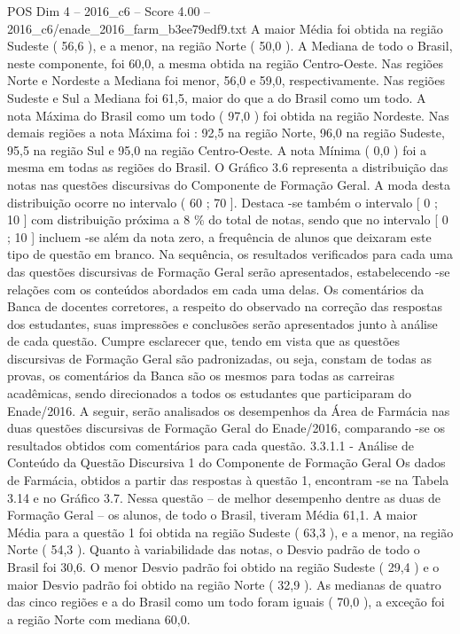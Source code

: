 \begin{textsample}{POS Dim 4 – 2016\_c6 – Score 4.00 – 2016\_c6/enade\_2016\_farm\_b3ee79edf9.txt}
A maior Média foi obtida na região Sudeste ( 56,6 ), e a menor, na região Norte ( 50,0 ).
A Mediana de todo o Brasil, neste componente, foi 60,0, a mesma obtida na região Centro-Oeste.
Nas regiões Norte e Nordeste a Mediana foi menor, 56,0 e 59,0, respectivamente.
Nas regiões Sudeste e Sul a Mediana foi 61,5, maior do que a do Brasil como um todo.
A nota Máxima do Brasil como um todo ( 97,0 ) foi obtida na região Nordeste.
Nas demais regiões a nota Máxima foi : 92,5 na região Norte, 96,0 na região Sudeste, 95,5 na região Sul e 95,0 na região Centro-Oeste.
A nota Mínima ( 0,0 ) foi a mesma em todas as regiões do Brasil.
O Gráfico 3.6 representa a distribuição das notas nas questões discursivas do Componente de Formação Geral.
A moda desta distribuição ocorre no intervalo ( 60 ; 70 ].
Destaca -se também o intervalo [ 0 ; 10 ] com distribuição próxima a 8 \% do total de notas, sendo que no intervalo [ 0 ; 10 ] incluem -se além da nota zero, a frequência de alunos que deixaram este tipo de questão em branco.
Na sequência, os resultados verificados para cada uma das questões discursivas de Formação Geral serão apresentados, estabelecendo -se relações com os conteúdos abordados em cada uma delas.
Os comentários da Banca de docentes corretores, a respeito do observado na correção das respostas dos estudantes, suas impressões e conclusões serão apresentados junto à análise de cada questão.
Cumpre esclarecer que, tendo em vista que as questões discursivas de Formação Geral são padronizadas, ou seja, constam de todas as provas, os comentários da Banca são os mesmos para todas as carreiras acadêmicas, sendo direcionados a todos os estudantes que participaram do Enade/2016.
A seguir, serão analisados os desempenhos da Área de Farmácia nas duas questões discursivas de Formação Geral do Enade/2016, comparando -se os resultados obtidos com comentários para cada questão. 3.3.1.1 - Análise de Conteúdo da Questão Discursiva 1 do Componente de Formação Geral Os dados de Farmácia, obtidos a partir das respostas à questão 1, encontram -se na Tabela 3.14 e no Gráfico 3.7.
Nessa questão – de melhor desempenho dentre as duas de Formação Geral – os alunos, de todo o Brasil, tiveram Média 61,1.
A maior Média para a questão 1 foi obtida na região Sudeste ( 63,3 ), e a menor, na região Norte ( 54,3 ).
Quanto à variabilidade das notas, o Desvio padrão de todo o Brasil foi 30,6.
O menor Desvio padrão foi obtido na região Sudeste ( 29,4 ) e o maior Desvio padrão foi obtido na região Norte ( 32,9 ).
As medianas de quatro das cinco regiões e a do Brasil como um todo foram iguais ( 70,0 ), a exceção foi a região Norte com mediana 60,0.

\end{textsample}

